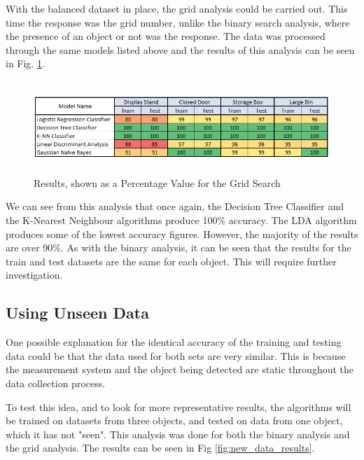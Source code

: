 \documentclass{svproc}
\begin{document}
With the balanced dataset in place, the grid analysis could be carried out. This time the response was the grid number, unlike the binary search 
analysis, where the presence of an object or not was the response. The data was processed through the same models listed above and the results 
of this analysis can be seen in Fig. \ref{fig:initial_analysis_gridsearch}.

\begin{figure}[ht]
\includegraphics[width=12cm, height=3.5cm]{images/initial_analysis_gridsearch.png}
\centering
\caption{Results, shown as a Percentage Value for the Grid Search}
\label{fig:initial_analysis_gridsearch}
\end{figure}

We can see from this analysis that once again, the Decision Tree Classifier and the K-Nearest Neighbour algorithms produce 100\% accuracy.  
The LDA algorithm produces some of the lowest accuracy figures. However, the majority of the results are over 90\%. As with the binary analysis, 
it can be seen that the results for the train and test datasets are the same for each object. This will require further investigation.

\subsection{Using Unseen Data}
One possible explanation for the identical accuracy of the training and testing data could be that the data used for both sets are very similar.
 This is because the measurement system and the object being detected are static throughout the data collection process. 

To test this idea, and to look for more representative results, the algorithms will be trained on datasets from three objects, and tested on 
data from one object, which it has not "seen". This analysis was done for both the binary analysis and the grid analysis. The results can be 
seen in Fig \ref{fig:new_data_results}.
\end{document}
